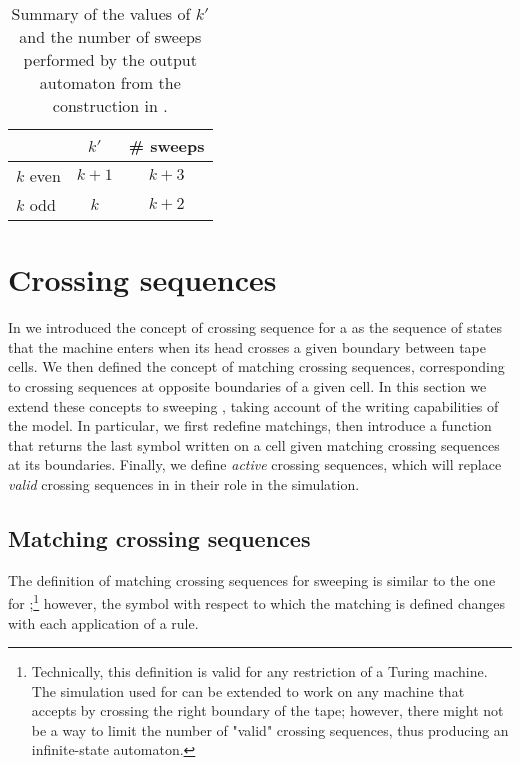 \begin{table}
	\centering
	\begin{tabular}{lcc}
		\toprule
		~        & $k'$  & \# sweeps \\
		\midrule
		$k$ even & $k+1$ & $k+3$     \\
		$k$ odd  & $k$   & $k+2$     \\
		\bottomrule
	\end{tabular}
	\caption{Summary of the values of $k'$ and the number of sweeps performed by the output automaton from the construction in .}
	\label{tab:kprimesweep}
\end{table}



\section{Crossing sequences}\label{sec:crossseqswdla}
In  we introduced the concept of crossing sequence for a \TDFA as the sequence of states that the machine enters when its head crosses a given boundary between tape cells.
We then defined the concept of matching crossing sequences, corresponding to crossing sequences at opposite boundaries of a given cell.
In this section we extend these concepts to sweeping \kDLAs, taking account of the writing capabilities of the model.
In particular, we first redefine matchings, then introduce a function that returns the last symbol written on a cell given matching crossing sequences at its boundaries.
Finally, we define \emph{active} crossing sequences, which will replace \emph{valid} crossing sequences in \TDFAs in their role in the simulation.


\subsection{Matching crossing sequences}
The definition of matching crossing sequences for sweeping \kDLAs is similar to the one for \TDFAs;\footnote{%
	Technically, this definition is valid for any restriction of a Turing machine. The simulation used for \TDFAs can be extended to work on any machine that accepts by crossing the right boundary of the tape; however, there might not be a way to limit the number of "valid" crossing sequences, thus producing an infinite-state automaton.}
however, the symbol with respect to which the matching is defined changes with each application of a rule.

